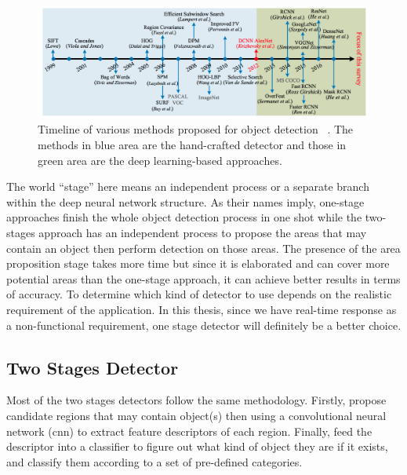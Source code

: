 \begin{figure}
    \includegraphics[width=\linewidth]{figures/timeline_od.png}
    \caption[Timeline of various methods proposed for object detection]
    {Timeline of various methods proposed for object detection
    ~\protect\cite{survey1-on-dl-od-2018}. The methods in blue area are the
    hand-crafted detector and those in green area are the deep
    learning-based approaches.}
    \label{fig:od-timeline}
\end{figure}

The world ``stage'' here means an independent process or a separate branch
within the deep neural network structure.
As their names imply, one-stage approaches finish the whole object detection
process in one shot
while the two-stages approach has an independent process to propose the areas
that may contain an object then perform detection on those areas. The
presence of the area proposition stage takes more time but since it is 
elaborated and can cover more potential areas than the one-stage approach, it 
can achieve better results in terms of accuracy.
To determine which kind of detector to use depends on the realistic
requirement of the application. In this thesis, since we have real-time response
as a non-functional requirement, one stage detector will definitely be a better 
choice. 

\subsection{Two Stages Detector}
\label{sec:related-worked-two-stages-detector}

Most of the two stages detectors follow the same methodology. Firstly,
propose candidate regions that may contain object(s) then using a
convolutional neural network (\acrshort{cnn}) to extract feature descriptors of 
each region.
Finally, feed the descriptor into a classifier to figure out what kind of 
object they are if it exists, and classify them according to a set of 
pre-defined categories.

